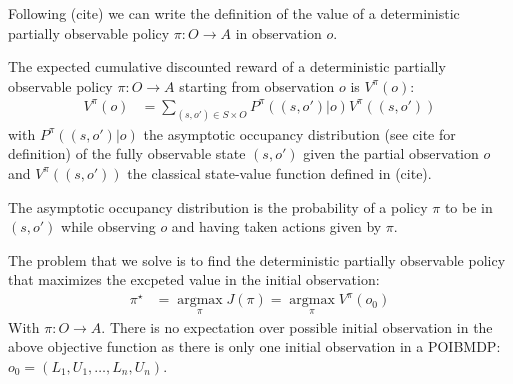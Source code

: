 Following (cite) we can write the definition of the value of a deterministic partially observable policy $\pi:O\rightarrow A$ in observation $o$.

\begin{definition} The expected cumulative discounted reward of a deterministic partially observable policy $\pi:O\rightarrow A$ starting from observation $o$ is $V^{\pi}(o)$:
    \begin{align*}
        V^{\pi}(o) &= \underset{(s,o')\in S\times O}{\sum}P^{\pi}((s, o')|o)V^{\pi}((s, o'))
    \end{align*}
with $P^{\pi}((s, o')|o)$ the asymptotic occupancy distribution (see cite for definition) of the fully observable state $(s,o')$ given the partial observation $o$ and $V^{\pi}((s, o'))$ the classical state-value function defined in (cite).
\end{definition}


The asymptotic occupancy distribution is the probability of a policy $\pi$ to be in $(s,o')$ while observing $o$ and having taken actions given by $\pi$.  

The problem that we solve is to find the deterministic partially observable policy that maximizes the excpeted value in the initial observation:
\begin{align}
    \pi^{\star} &= \underset{\pi}{\operatorname{argmax}}J(\pi) = \underset{\pi}{\operatorname{argmax}}V^{\pi}(o_0)
\end{align}
With $\pi:O\rightarrow A$. There is no expectation over possible initial observation in the above objective function as there is only one initial observation in a POIBMDP: $o_0=(L_1, U_1, \dots, L_n, U_n)$.

